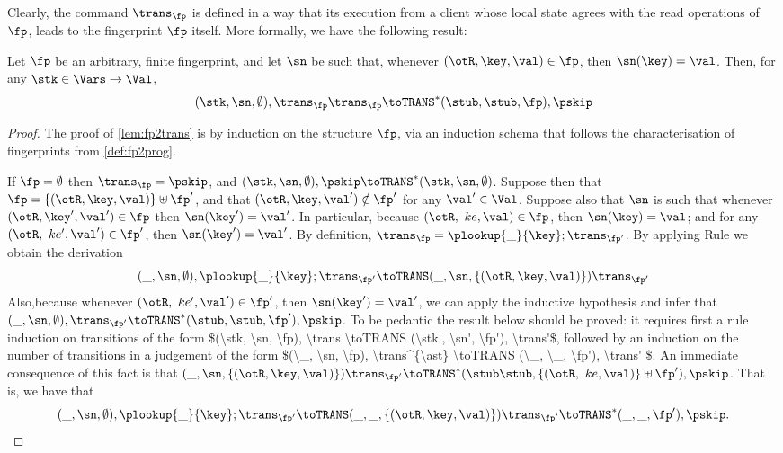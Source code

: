 Clearly, the command $\trans_{\fp}$  is defined in a way that its 
execution from a client whose local state agrees with the read operations 
of $\fp$,  leads to the fingerprint $\fp$ itself. More formally, we have the 
following result: 
\begin{lemma}
\label{lem:fp2trans}
Let $\fp$ be an arbitrary, finite fingerprint, and let $\sn$ be such that, whenever 
$(\otR, \key, \val) \in \fp$, then $\sn(\key) = \val$. Then, for any $\stk \in \Vars \rightarrow \Val$,
\[
(\stk, \sn, \emptyset), \trans_{\fp} \trans_{\fp} \toTRANS^{\ast} (\stub, \stub, \fp), \pskip
\]
\end{lemma}

\begin{proof}
The proof of \cref{lem:fp2trans} is by induction on the structure $\fp$, via an 
induction schema that follows the characterisation of fingerprints from \cref{def:fp2prog}.

If $\fp = \emptyset$ then $\trans_{\fp} = \pskip$, and $(\stk, \sn, \emptyset), 
\pskip \toTRANS^{\ast} (\stk, \sn, \emptyset)$. 
Suppose then that $\fp = \{(\otR, \key, \val)\} \uplus \fp'$, and that 
$(\otR, \key, \val') \notin \fp'$ for any $\val' \in \Val$. 
Suppose also that $\sn$ is such that whenever $(\otR, \key', \val') \in \fp$ then $\sn(\key') = \val'$. 
In particular, because $(\otR,\ ke, \val) \in \fp$, then $\sn(\key) = \val$; and for any $(\otR,\ ke', \val') \in \fp'$, 
then $\sn(\key') = \val'$. 
By definition, $\trans_{\fp} = \plookup{\_}{\key} ; \trans_{\fp'}$. By applying Rule  
we obtain the derivation 
\[
(\_, \sn, \emptyset), \plookup{\_}{\key} ; \trans_{\fp'} \toTRANS (\_, \sn, \{(\otR, \key, \val)\}) \trans_{\fp'}
\]
Also,because whenever $(\otR,\ ke', \val') \in \fp'$, 
then $\sn(\key') = \val'$,  we can apply the inductive hypothesis and infer that $(\_, \sn, \emptyset), \trans_{\fp'} \toTRANS^{\ast} (\stub, \stub, \fp'), \pskip$. 
\ac{To be pedantic the result below should be proved: it requires first a rule induction on 
transitions of the form $(\stk, \sn, \fp), \trans \toTRANS (\stk', \sn', \fp'), \trans'$, followed by an induction on the 
number of transitions in a judgement of the form $(\_, \sn, \fp), \trans^{\ast} \toTRANS (\_, \_, \fp'), \trans' $.}
An immediate consequence of this fact is that 
$(\_, \sn, \{(\otR,\key, \val)\}) \trans_{\fp'} \toTRANS^{\ast} (\stub \stub, \{(\otR,\ ke, \val)\} \uplus \fp'), \pskip$. 
That is, we have that 
\[
(\_, \sn, \emptyset), \plookup{\_}{\key} ; \trans_{\fp'} \toTRANS (\_, \_, \{(\otR, \key, \val)\}) \trans_{\fp'} \toTRANS^{\ast} (\_, \_, \fp'), \pskip.
\]


\end{proof}
